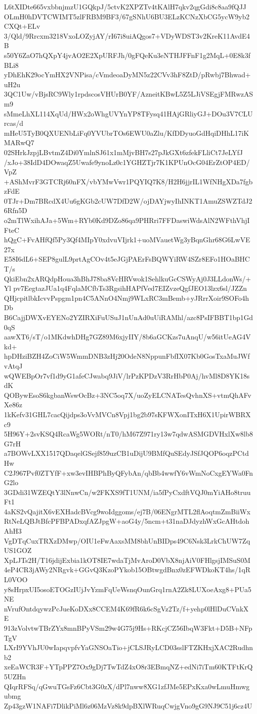 L6tXIDte665vxbbnjmzU1GQkpJ/5ctvK2XPZTv4tKAlH7qkv2qgGdi8c8aa9fQJJ
OLmH0hDVTCWIMT5zlFRBM9BF3/67gSNhU6BU3ELzKCNzXbCG5ycW9yb2CXQt+ELv
3/Qld/9Rrcxm3218VxoLOZyjAY/rI67i8uiAQgos7+VDyWDST3v2KreK11AvdE4B
s50Y6ZaO7hQXpY4jvAO2E2XpURFJh/0gFQeKu3eNTHJFFnF1g2MqL+0E8k3fBLi8
yDhEhK29ocYmHX2VNPisa/cVmdeoaDyMN5z22CVv3hF8ZtD/pRwbj7Bhwad+uH2u
3QC1Uw/vBjsRC9Wly1rpdscosVHUrB0YF/AzneitKBwL5Z5LJiVSEgjFMRwzASm9
sMmeLhXL114XqUd/HWx2oWhgUVYnYP8TFysq41HAjGRliyGJ+DOu3V7CLUrcas/d
mHeU5TyB0QXUENbLiFq0YVUbrTOs6EWU0aZlu/KfDDyuoGdHqiDHhL17iKMARwQ7
02SHrkJzpjLBvtmZ4Di0YmlnSJ61x1mMjvBH7s27pJkGXt6zfekFLliCt7JeLYfJ
/xJo+38IdD4DOwaqZ5Uwafe9ynoLz0c1YGHZTjr7K1KPUnOcG04ErZtOP4ED/VpZ
+AShMvrF3GTCRj60nFX/vbYMwVwr1PQYIQ7K8/H2H6jjrIL1WfNHgXDa7fgbzFdE
0TJr+Dm7BRcdX4Uu6gKGb2cUW7DfD2W/ojDAYjwyIhINKT1AmuZSWZTdJ26Rfn5D
o2mTlWxihAJa+5Wm+RYb0Kd9DZo86qa9PHRri7FFDaswiWdsAlN2WFthVhjIFteC
hQgC+FvAHfQf5Py3Qf4MIpY0xdvuVIjrk1+uoMVauetWg3yBqnGhr68G6LwVE27x
E58I6dL6+SEP8gulL9prtAgCOv4t5eJGjPAErFsBQWYiRW4SZr8EFo1HOaBHCT/s
QkiEbn2xARQdpHoua3hBhJ78ba8VcHRVwok1SehlkuGcCSWyAj0J3LLdonWs/+Yl
pv7EegtazJUa1q4FqlaMCfbTs3RgsihHAPfVed7EIZvzeQgfJEO13lzx6sl/JZZn
QHjcpitlbkIcvvPspgm1pn4C5ANnO4Nmj9WLxRC3mBemb+yJRrrXoir9SOFo4hDb
B6CajjDWXvEYENo2YZIRXiFuUSuJ1nUnAd0uUiRAMhl/azc8PsIFBBT1bp1Gd0qS
aawXT6/sT/o1MKdwhDHg7GZ89M6xjyIIY/8b6aGCKzs7uAnqU/w56itUeAG4Vkd+
hpDHziBZH4ZoCiW5WmmDNB3zHj20OdeN8NppunFbfIX07Kb0GosTxaMuJWfvAtqJ
wQWEBpOr7vf1d9yG1afeCJwabq9JiV/lrPzKPDzV3RrHbP0Aj/hvMl8D8YK18sdK
QOBywEsoS6kgbanWswOcBz+3NC5oq7X/uoZyELCNATesQvhnXS+vtmQhAFvXe86z
1kKefv31GHL7cacQijdps3oVvMVCn8Vpj1bg2b97sKFWXonITxH6X1UpirWBRXc9
5H96Y+2svKSQ4RcaWg5WORt/nT0/hM67Z971ry13w7qdwASMGDVHxlXw8lb8G7rH
a7BOWvLXX1517QDaqelGSejf859uzCB1uDijU9BMfQuSEdyJSfJQOP6oqzPCtdHw
C2J967Pvf0ZTYfF+xw3evIHBPhByQFybAn/qbBb4wwfY6vWmNoCxgEYWa0FnG2lo
3GDdi31WZEQtY3lNnwCn/w2FKXS9fT1UNM/ia5fPyCxdftVQJ0mYiAHo8truuFt1
4aKS2vQajitX6vEXHadcBVcg9woIdggoms/ej7B/06ENgrMTL2flAoqtmZmBiiWx
RtNeLQBJtBfcPFBPADxqfAZJpgW+aoG4y/5ncm+t31naDJdyzhWxGcAHtdohAhH3
VgDTqCuxTRXzDMwp/OIU1eFwAaxsMM8bhUnBIDps49C6Nsk3LrkChUW7ZqUS1GOZ
XpLJTs2H/T16jdijExbia1kOT8IE7wdaTjMvAroD0VbX8njAiV0FHlgsjIMSuS0M
4eP4CR3jAWy2NRgvk+GGvQ3KzoPYkob15OBtwgdBnx0zEFWDkoKT4hs/1qRL0VOO
y8sHrpxUI5osoETOGzIUjJvYzmFqUeWsnqOunGrq1rnA2Zk8LUXoeAxg8+PUa5NE
nVrufOntdqywzPcJueKoDXx8CCEM4K69fR6k6cSgVz2Tz/f+yehp0lHlDuCVnkXE
913zVolvtwTBrZYx8mnBPyVSm29w4G75j9Hs+RKcjCZ56IbqW3Fkt+D5B+NFpTgV
LXrI9YVhJU0wIapqvpfvYaGNSOaTio+jCLSJRyLCD03sslFTZKHxjXAC2Rudhnb2
xeEaWCR3F+YTpPPZ7Ox9gDj7TwTdZ4xO8r3EBmqNZ+edNi7iTm60KTFtKrQ5UZHn
QIqrRFSq/qGwuTGsFz6Cbt3G0zX/dPl7nww8XG1zfJMe5EPxKxa0wLmuHmwgubmg
Zp43gzW1NAFi7DlikPiMl6z06MzVz8k9dpBXlWRuqCwjgVno9gG9NJ9C51j6cz4U
